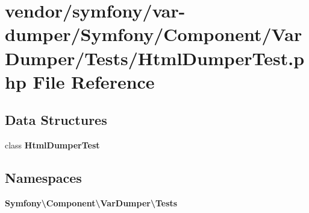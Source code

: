 \section{vendor/symfony/var-\/dumper/\+Symfony/\+Component/\+Var\+Dumper/\+Tests/\+Html\+Dumper\+Test.php File Reference}
\label{_html_dumper_test_8php}
\subsection*{Data Structures}
\begin{DoxyCompactItemize}
\item 
class {\bf Html\+Dumper\+Test}
\end{DoxyCompactItemize}
\subsection*{Namespaces}
\begin{DoxyCompactItemize}
\item 
 {\bf Symfony\textbackslash{}\+Component\textbackslash{}\+Var\+Dumper\textbackslash{}\+Tests}
\end{DoxyCompactItemize}
